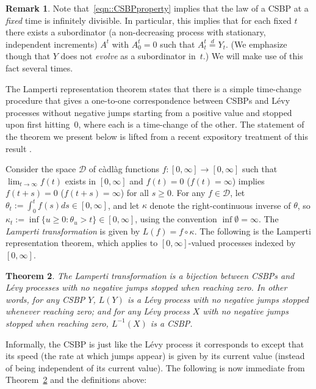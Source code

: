 \documentclass[JEP,XML,SOM,Unicode]{cedram}
\let\mathcal\mathscr
\theoremstyle{plain}
\newtheorem{theorem}{Theorem}
\numberwithin{theorem}{section}
\theoremstyle{definition}
\newtheorem{remark}[theorem]{Remark}
\newcommand{\cadlag}{càdlàg}
\begin{document}
\begin{remark}
\label{rem::CSBPsubordinator}
Note that~\eqref{eqn::CSBPproperty} implies that the law of a CSBP at a \emph{fixed} time is infinitely divisible. In particular, this implies that for each fixed $t$ there exists a subordinator (\ie a non-decreasing process with stationary, independent increments) $A^t$ with $A_0^t = 0$ such that $A_t^t \stackrel{d}{=} Y_t$. (We emphasize though that $Y$ does not \emph{evolve} as a subordinator in~$t$.) We will make use of this fact several times.
\end{remark}

The Lamperti representation theorem states that there is a simple time-change procedure that gives a one-to-one correspondence between CSBPs and Lévy processes without negative jumps starting from a positive value and stopped upon first hitting~$0$, where each is a time-change of the other. The statement of the theorem we present below is lifted from a recent expository treatment of this result \cite{surveyproofoflampertirepresentation}.

Consider the space $\mathcal D$ of {\cadlag} functions $f\colon [0,\infty] \to [0,\infty]$ such that $\lim_{t \to \infty} f(t)$ exists in $[0,\infty]$ and $f(t) = 0$ (\resp $f(t) = \infty$) implies $f(t+s) = 0$ (\resp $f(t+s)= \infty$) for all $s \geq 0$. For any $f \in \mathcal D$, let $\theta_t := \int_0^t f(s) ds \in [0,\infty]$, and let $\kappa$ denote the right-continuous inverse of $\theta$, so $\kappa_t := \inf \{u \geq 0 : \theta_u > t \} \in [0,\infty]$, using the convention $\inf \emptyset = \infty$. The \emph{Lamperti transformation} is given by $L(f) = f \circ \kappa$. The following is the Lamperti representation theorem, which applies to $[0,\infty]$-valued processes indexed by $[0,\infty]$.

\begin{theorem}
\label{thm::lamperti}
The Lamperti transformation is a bijection between CSBPs and Lévy processes with no negative jumps stopped when reaching zero. In other words, for any CSBP $Y$, $L(Y)$ is a Lévy process with no negative jumps stopped whenever reaching zero; and for any Lévy process $X$ with no negative jumps stopped when reaching zero, $L^{-1}(X)$ is a CSBP.
\end{theorem}

Informally, the CSBP is just like the Lévy process it corresponds to except that its speed (the rate at which jumps appear) is given by its current value (instead of being independent of its current value). The following is now immediate from Theorem~\ref{thm::lamperti} and the definitions above:
\end{document}
